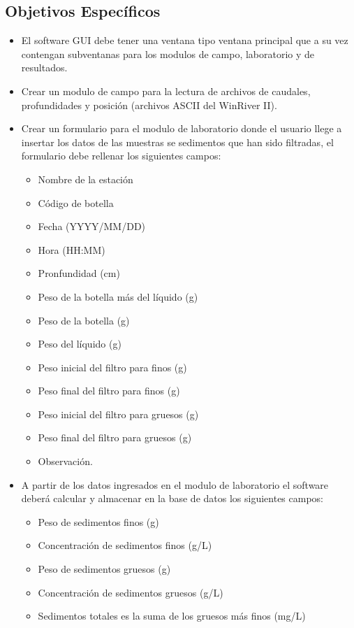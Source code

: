 \documentclass[12pt,a4paper]{report}
\begin{document}
	\subsection{Objetivos Específicos}
	\begin{itemize}
	\item El software GUI debe tener una ventana tipo ventana principal que a su vez contengan subventanas para los modulos de campo, laboratorio y de resultados.
	\item Crear un modulo de campo para la lectura de archivos de caudales, profundidades y posición (archivos ASCII del WinRiver II).
	\item Crear un formulario para el modulo de laboratorio donde el usuario llege a insertar los datos de las muestras se sedimentos que han sido filtradas, el formulario debe rellenar los siguientes campos:
	\begin{itemize}
		\item Nombre de la estación
		\item Código de botella
		\item Fecha (YYYY/MM/DD)
		\item Hora (HH:MM)
		\item Pronfundidad (cm)
		\item Peso de la botella más del líquido (g)
		\item Peso de la botella (g)
		\item Peso del líquido (g)
		\item Peso inicial del filtro para finos (g)
		\item Peso final del filtro para finos (g)
		\item Peso inicial del filtro para gruesos (g)
		\item Peso final del filtro para gruesos (g)
		\item Observación.
	\end{itemize}
	\item A partir de los datos ingresados en el modulo de laboratorio el software deberá calcular y almacenar en la base de datos los siguientes campos:
	\begin{itemize}
		\item Peso de sedimentos finos (g)
		\item Concentración de sedimentos finos (g/L)
		\item Peso de sedimentos gruesos (g)
		\item Concentración de sedimentos gruesos (g/L)
		\item Sedimentos totales es la suma de los gruesos más finos (mg/L)

\end{itemize}
\end{itemize}
\end{document}
